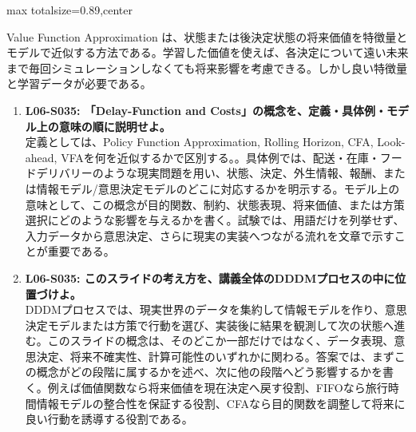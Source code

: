 \begin{minipage}[t]{0.58\textwidth}
\begin{adjustbox}{max totalsize={\textwidth}{0.89\textheight},center}
\begin{minipage}{\textwidth}
Value Function Approximation は、状態または後決定状態の将来価値を特徴量とモデルで近似する方法である。学習した価値を使えば、各決定について遠い未来まで毎回シミュレーションしなくても将来影響を考慮できる。しかし良い特徴量と学習データが必要である。\par{}\begin{enumerate}\item \textbf{L06-S035: 「Delay-Function and Costs」の概念を、定義・具体例・モデル上の意味の順に説明せよ。}\\定義としては、Policy Function Approximation, Rolling Horizon, CFA, Look-ahead, VFAを何を近似するかで区別する。。具体例では、配送・在庫・フードデリバリーのような現実問題を用い、状態、決定、外生情報、報酬、または情報モデル/意思決定モデルのどこに対応するかを明示する。モデル上の意味として、この概念が目的関数、制約、状態表現、将来価値、または方策選択にどのような影響を与えるかを書く。試験では、用語だけを列挙せず、入力データから意思決定、さらに現実の実装へつながる流れを文章で示すことが重要である。\item \textbf{L06-S035: このスライドの考え方を、講義全体のDDDMプロセスの中に位置づけよ。}\\DDDMプロセスでは、現実世界のデータを集約して情報モデルを作り、意思決定モデルまたは方策で行動を選び、実装後に結果を観測して次の状態へ進む。このスライドの概念は、そのどこか一部だけではなく、データ表現、意思決定、将来不確実性、計算可能性のいずれかに関わる。答案では、まずこの概念がどの段階に属するかを述べ、次に他の段階へどう影響するかを書く。例えば価値関数なら将来価値を現在決定へ戻す役割、FIFOなら旅行時間情報モデルの整合性を保証する役割、CFAなら目的関数を調整して将来に良い行動を誘導する役割である。\end{enumerate}
\end{minipage}
\end{adjustbox}
\end{minipage}


